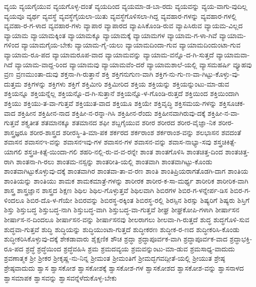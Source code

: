 {ವ್ಯಯ
ವ್ಯಯಗೈಯುವ
ವ್ಯಯಗೊಳ್ಳ-ದಂತೆ
ವ್ಯಯದಿಂದ
ವ್ಯಯಮಾ-ಡ-ಬಾ-ರದು
ವ್ಯಯವನ್ನು
ವ್ಯಯ-ವಾಗು-ವುದಿಲ್ಲ
ವ್ಯಯವೂ
ವ್ಯರ್ಥ
ವ್ಯವಸ್ಥೆ
ವ್ಯವಸ್ಥೆಗೈಯಲಾ-ಯಿತು
ವ್ಯವಸ್ಥೆಗೊಳಿಸಲಾ-ಗಿದ್ದ
ವ್ಯವಹಾರ-ಗಳನ್ನು
ವ್ಯವಹಾರ-ಗಳಲ್ಲಿ
ವ್ಯವಹಾ-ರ-ಗ-ಳಾದ
ವ್ಯವಹಾರ-ಗಳು
ವ್ಯಾಪಾರ
ವ್ಯಾಪಾರದ
ವ್ಯಾಪಿಸಿಕೊಂಡಿ-ರುವ
ವ್ಯಾಪಿಸಿರುವ
ವ್ಯಾಯಮ-ವಿಲ್ಲದ
ವ್ಯಾಯಾಮ
ವ್ಯಾಯಾಮಕ್ಕಿಂತ
ವ್ಯಾಯಾಮಕ್ಕೂ
ವ್ಯಾಯಾಮಕ್ಕೆ
ವ್ಯಾಯಾಮಗಳ
ವ್ಯಾಯಾಮ-ಗ-ಳಾ-ಗಿವೆ
ವ್ಯಾಯಾಮ-ಗಳಿಂದ
ವ್ಯಾಯಾಮಗೈಯ-ಬೇಕು
ವ್ಯಾಯಾಮ-ಗೈ-ಯಲು
ವ್ಯಾಯಾಮದಿಂದಾ-ಗುವ
ವ್ಯಾಯಾಮದಿಂದುಂಟಾ-ಗುವ
ವ್ಯಾಯಾಮ-ರೂ-ಪದ
ವ್ಯಾಯಾಮರೂಪ-ವಾದ
ವ್ಯಾಯಾಮವನ್ನು
ವ್ಯಾಯಾಮ-ವನ್ನೊ-ದ-ಗಿ-ಸುತ್ತದೆ
ವ್ಯಾಯಾಮವಾ-ಗಿದೆ
ವ್ಯಾಯಾಮ-ವಾದ್ದ-ರಿಂದ
ವ್ಯಾಯಾಮವು
ವ್ಯಾಯಾಮವೆಂ-ದರೆ
ವ್ಯಾಯಾಮಶಾಲೆ-ಯಲ್ಲಿ
ವ್ಯಾಸಮಹರ್ಷಿ
ವ್ಯೂಹವು
ವ್ರಣ
ವ್ರಣಮುಂತಾ-ದುವು
ಶಕ್ತನಾ-ಗಿ-ರುತ್ತಾನೆ
ಶಕ್ತಿ
ಶಕ್ತಿಗನುಗುಣ-ವಾಗಿ
ಶಕ್ತಿಗ-ನು-ಗು-ಣ-ವಾ-ಗಿಟ್ಟು-ಕೊಳ್ಳು-ವು-ದುತ್ತಮ
ಶಕ್ತಿಗಳನ್ನು
ಶಕ್ತಿಗಳು
ಶಕ್ತಿಗೆ
ಶಕ್ತಿಮೀರಿ
ಶಕ್ತಿಮೀರಿದ
ಶಕ್ತಿಯ
ಶಕ್ತಿಯನ್ನು
ಶಕ್ತಿಯನ್ನುಂಟು-ಮಾ-ಡುವ
ಶಕ್ತಿಯನ್ನೂ
ಶಕ್ತಿಯನ್ನೆಲ್ಲ
ಶಕ್ತಿಯನ್ನೊ-ದ-ಗಿ-ಸುತ್ತಾನೆ
ಶಕ್ತಿಯನ್ನೊ-ಳ-ಗೊಂಡಿ-ರುತ್ತದೆ
ಶಕ್ತಿಯಿಂದ
ಶಕ್ತಿಯಿಂದಾಗಿ
ಶಕ್ತಿಯು
ಶಕ್ತಿಯು-ತ-ವಾ-ಗುತ್ತವೆ
ಶಕ್ತಿಯುತ-ವಾದ
ಶಕ್ತಿಯೂ
ಶಕ್ತಿಯೇ
ಶಕ್ತಿವೃದ್ಧಿ
ಶಕ್ತಿಸಮಯ-ಗಳನ್ನು
ಶಕ್ತಿಸೂಚಕ-ವಾದ
ಶಕ್ತಿಹೀನ
ಶಕ್ತಿಹೀನ-ನಾದ
ಶಕ್ತಿಹೀ-ನ-ರನ್ನಾ-ಗಿಸಿ
ಶಕ್ತಿಹೀನ-ರೆಂದು
ಶಕ್ತಿಹೀನವಾಗಿರುವು-ದಕ್ಕೆ
ಶಕ್ತಿಹೀ-ನ-ವಾ-ಗುತ್ತವೆ
ಶಕ್ತ್ಯತೀತ
ಶತಮಾನಕ್ಕೂ
ಶತಮಾನದ
ಶಫೀ
ಶಬ್ದಗೈಯುವ
ಶರೀರ
ಶರೀರದ
ಶರೀರ-ವೈಜ್ಞಾ-ನಿಕ
ಶರೀರ-ಶಾಸ್ತ್ರಜ್ಞರೂ
ಶರೀರ-ಶಾಸ್ತ್ರದ
ಶರೀರಸ್ಥಿ-ತಿ-ಮಾ-ಪಕ
ಶರ್ಕರದ
ಶರ್ಕರಾಂಶ
ಶರ್ಕರಾಂಶ-ವನ್ನು
ಶಲಭಾಸನ
ಶವದಂತೆ
ಶವಾಸನ
ಶವಾಸನಇ-ವನ್ನು
ಶವಾಸನಇವು-ಗಳ
ಶವಾಸನ-ಗಳ
ಶವಾಸನ-ವನ್ನು
ಶವಾಸ-ನಾಭ್ಯಾ-ಸವು
ಶಸ್ತ್ರಚಿಕಿತ್ಸೆ-ಯಾಗಲಿ
ಶಸ್ತ್ರಚಿ-ಕಿತ್ಸೆ-ಯಿಂದಾ-ಗಲಿ
ಶಹರಿ-ನಲ್ಲಿ-ರು-ವ-ವ-ರನ್ನೇ
ಶಾಂತ
ಶಾಂತಗೊಳಿಸಿ
ಶಾಂತಚಿತ್ತ-ದಿಂದ
ಶಾಂತಚಿತ್ತ-ರಾಗಿ
ಶಾಂತನಾ-ಗಿ-ರಲು
ಶಾಂತಮ-ನಸ್ಸನ್ನು
ಶಾಂತರೀತಿ-ಯಲ್ಲಿ
ಶಾಂತವಾಗಿ
ಶಾಂತವಾಗಿಟ್ಟು-ಕೊಂಡು
ಶಾಂತವಾಗಿಟ್ಟುಕೊಳ್ಳುವು-ದಕ್ಕೆ
ಶಾಂತವಾಗಿರ
ಶಾಂತವಾ-ತಾ-ವ-ರಣ
ಶಾಂತಿ
ಶಾಂತಿಪ್ರಿಯರಾಗತೊಡಗಿ-ದಾಗ
ಶಾಂತಿಯ
ಶಾಂತಿಯನ್ನು
ಶಾಂತಿಯು
ಶಾಮಕ
ಶಾಮಕಮಾತ್ರೆ-ಗಳನ್ನು
ಶಾರೀರಕ
ಶಾರೀರ-ಕ-ಸಾ-ಮರ್ಥ್ಯ
ಶಾರೀರಿಕ
ಶಾರೀರಿಕ-ವಾಗಿ
ಶಾಸ್ತ್ರ
ಶಾಸ್ತ್ರಜ್ಞಾನ
ಶಾಸ್ತ್ರದ
ಶಿಕ್ಷಣ
ಶಿಥಿಲ
ಶಿಥಿಲ-ಗೊಳ್ಳುತ್ತವೆ
ಶಿಥಿಲವಾಗಿ
ಶಿಬಿರಗಳ
ಶಿಬಿರ-ಗ-ಳನ್ನೇರ್ಪ-ಡಿಸ
ಶಿಬಿರ-ಗ-ಳಿಂದಲೂ
ಶಿಬಿರ-ದೊ-ಳ-ಗೆಯೇ
ಶಿಬಿರವನ್ನು
ಶಿಬಿರಸ್ಥ-ರಕ್ಕಿಂತ
ಶಿಬಿರಸ್ಥ-ರಲ್ಲಿ
ಶಿರಸ್ಸಿನ
ಶಿರಸ್ಸು
ಶಿಷ್ಯರಿಗೆ
ಶಿಷ್ಯರು
ಶಿಸ್ತಿಗೆ
ಶಿಸ್ತು
ಶಿಸ್ತುಬದ್ಧ
ಶಿಸ್ತುಬದ್ಧ-ನಾಗಿ
ಶಿಸ್ತುಬದ್ಧ-ವಾಗಿ
ಶಿಸ್ತುಬದ್ಧ-ವಾ-ಗುತ್ತವೆ
ಶೀಘ್ರ
ಶೀಘ್ರಕೋಪಿ-ಗಳಾಗಿ
ಶೀರ್ಷಾಸನ
ಶೀರ್ಷಾಸ-ನ-ದಿಂದಲೂ
ಶೀರ್ಷಾಸನ-ವನ್ನು
ಶೀರ್ಷಾಸನವು
ಶೀಲರಾಗಲು
ಶೀಲವಾ-ಗಿ-ರುತ್ತದೆ
ಶುದ್ಧ
ಶುದ್ಧಗೊಳಿ-ಸುವ
ಶುದ್ಧವಾ-ಗುತ್ತವೆ
ಶುದ್ಧಿ
ಶುದ್ಧಿಯನ್ನು
ಶುದ್ಧಿಯುಂಟಾ-ಗುತ್ತದೆ
ಶುದ್ಧೀಕರಣ
ಶುದ್ಧೀಕ-ರ-ಣದ
ಶುದ್ಧೀಕರಿಸಿ-ಕೊಂಡು
ಶುದ್ಧೀಕರಿಸಿಕೊಳ್ಳುವು-ದಕ್ಕೆ
ಶೇಕಡಾವಾರು
ಶೈಕ್ಷಣಿಕ
ಶೌಚ
ಶ್ರದ್ಧಾ
ಶ್ರದ್ಧಾಪೂರ್ವಕ-ವಾಗಿ
ಶ್ರದ್ಧಾಪೂರ್ವಕ-ವಾದ
ಶ್ರದ್ಧಾಭಕ್ತಿ-ರೂ-ಪದ
ಶ್ರದ್ಧೆ
ಶ್ರದ್ಧೆಯಿಂದ
ಶ್ರದ್ಧೆವಹಿಸಿ
ಶ್ರಮ
ಶ್ರಮದವ್ಯಯ
ಶ್ರಮವನ್ನುಂಟು-ಮಾ-ಡುವ
ಶ್ರಮಸಾಧ್ಯ-ವಾದುದು
ಶ್ರವಣಾತ್ಮಕ
ಶ್ರೀ
ಶ್ರೀಕರ
ಶ್ರೀಕೃಷ್ಣ-ನು-ನಿನ್ನ
ಶ್ರೀಮಂತ
ಶ್ರೀಮಂತಿಗೆ
ಶ್ರೀಮದ್ಭಗವದ್ಗೀತೆ-ಯಲ್ಲಿ
ಶ್ರೀಯುತ
ಶ್ರೇಷ್ಠ
ಶ್ರೇಷ್ಠವಾದುದು
ಶ್ವಾಸ
ಶ್ವಾಸಕೋಶ
ಶ್ವಾಸಕೋಶಕ್ಕೆ
ಶ್ವಾಸಕೋಶ-ಗಳ
ಶ್ವಾಸಕೋಶದ
ಶ್ವಾಸಕೋಶ-ವನ್ನು
ಶ್ವಾಸನಾಳದ
ಶ್ವಾಸಮಾಪಕ
ಶ್ವಾಸವನ್ನು
ಶ್ವಾಸವನ್ನೆಳೆದುಕೊಳ್ಳ-ಬೇಕು
}
